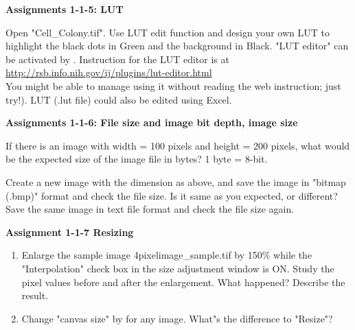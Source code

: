 \textbf{\sffamily
Assignments 1-1-5: LUT}

Open "Cell\_Colony.tif". Use LUT edit function and design your own LUT to highlight the black dots in
Green and the background in Black. "LUT editor" can be activated by . Instruction for the LUT editor is at\\
\url{http://rsb.info.nih.gov/ij/plugins/lut-editor.html} \\
You might be able to manage using it without reading the web instruction; just try!). LUT (.lut file) could also be edited using Excel. 

\textbf{\sffamily
Assignments 1-1-6: File size and image bit depth, image size}

If there is an image with width = 100 pixels and height = 200 pixels,
what would be the expected size of the image file in bytes? 1 byte =
8-bit.

Create a new image with the dimension as above, and save the image in
"bitmap (.bmp)" format and check the file
size. Is it same as you expected, or different? Save the same image in
text file format and check the file size again.

\textbf{\sffamily
Assignment 1-1-7 Resizing}

\begin{enumerate}
\item Enlarge the sample image 4pixelimage\_sample.tif by
150\% while the "Interpolation"
check box in the size adjustment window is ON. Study the pixel values
before and after the enlargement. What happened? Describe the result.

\item Change "canvas size" by  for any image. What"s the
difference to "Resize"?
\end{enumerate}


